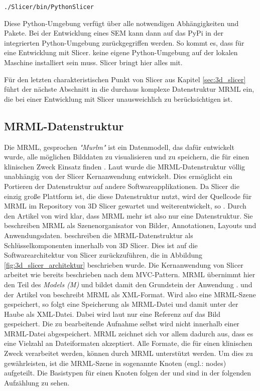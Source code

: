 \begin{center}
	\texttt{./Slicer/bin/PythonSlicer}
\end{center}

Diese Python-Umgebung verfügt über alle notwendigen Abhängigkeiten und Pakete. Bei
der Entwicklung eines \ac{SEM} kann dann auf das \ac{PyPi} in der integrierten Python-Umgebung
zurückgegriffen werden. So kommt es, dass für eine Entwicklung mit Slicer. keine
eigene Python-Umgebung auf der lokalen Maschine installiert sein muss. Slicer bringt
hier alles mit.

Für den letzten charakteristischen Punkt von Slicer aus Kapitel \ref{sec:3d_slicer}
führt der nächste Abschnitt in die durchaus komplexe Datenstruktur \ac{MRML} ein,
die bei einer Entwicklung mit Slicer unausweichlich zu berücksichtigen ist.

\subsection{MRML-Datenstruktur}
\label{subsec:mrml_datenstruktur} Die \ac{MRML}, gesprochen \textit{"Murlm"} ist
ein Datenmodell, das dafür entwickelt wurde, alle möglichen Bilddaten zu
visualisieren und zu speichern, die für einen klinischen Zweck Einsatz finden \citep[vgl.][]{slicer2024}.
Laut \citet{slicer2024} wurde die \ac{MRML}-Datenstruktur völlig unabhängig von der
Slicer Kernanwendung entwickelt. Dies ermöglicht ein Portieren der Datenstruktur
auf andere Softwareapplikationen. Da Slicer die einzig große Plattform ist, die
diese Datenstruktur nutzt, wird der Quellcode für \ac{MRML} im Repository von 3D
Slicer gewartet und weiterentwickelt, so \citet{slicer2024}. Durch den Artikel von
\citet[S.~1331]{fedorov2012slicer} wird klar, dass \ac{MRML} mehr ist also nur
eine Datenstruktur. Sie beschreiben \ac{MRML} als Szenenorganisator von Bilder, Annotationen,
Layouts und Anwendungsdaten. \citet[S.~1327]{fedorov2012slicer} beschreiben die
\ac{MRML}-Datenstruktur als Schlüsselkomponenten innerhalb von 3D Slicer. Dies
ist auf die Softwarearchitektur von Slicer zurückzuführen, die in Abbildung \ref{fig:3d_slicer_architektur}
beschrieben wurde. Die Kernanwendung von Slicer arbeitet wie bereits beschrieben
nach dem \ac{MVC}-Pattern. \ac{MRML} übernimmt hier den Teil des \textit{Models
(M)} und bildet damit den Grundstein der Anwendung \citep[vgl.][S.~1332]{fedorov2012slicer}.
\citet{slicer2024} und der Artikel von \citet[S.~1327]{fedorov2012slicer}
beschreibt \ac{MRML} als \ac{XML}-Format. Wird also eine \ac{MRML}-Szene
gespeichert, so folgt eine Speicherung als \ac{MRML}-Datei und damit unter der
Haube als \ac{XML}-Datei. Dabei wird laut \citet{slicer2024} nur eine Referenz auf
das Bild gespeichert. Die zu bearbeitende Aufnahme selbst wird nicht innerhalb
einer \ac{MRML}-Datei abgespeichert. \ac{MRML} zeichnet sich vor allem dadurch aus,
dass es eine Vielzahl an Dateiformaten akzeptiert. Alle Formate, die für einen
klinischen Zweck verarbeitet werden, können durch \ac{MRML} unterstützt werden. Um
dies zu gewährleisten, ist die \ac{MRML}-Szene in sogenannte Knoten (engl.:
nodes) aufgeteilt. Die Basistypen für einen Knoten folgen der \citet{slicer2024}
und sind in der folgenden Aufzählung zu sehen.

